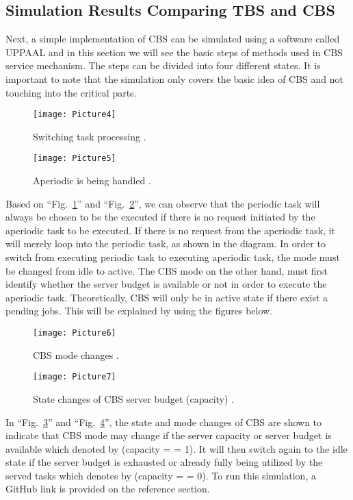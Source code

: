 \subsection{Simulation Results Comparing TBS and CBS}

Next, a simple implementation of CBS can be simulated using a software called UPPAAL and in this section we will see the basic steps of methods used in CBS service mechanism. The steps can be divided into four different states. It is important to note that the simulation only covers the basic idea of CBS and not touching into the critical parts. 

\begin{figure}[htp]
    \centering
    \texttt{[image: Picture4]}
    \caption{Switching task processing \cite{b10}.}
    \label{ikan1}
\end{figure}

\begin{figure}[htp]
    \centering
    \texttt{[image: Picture5]}
    \caption{Aperiodic is being handled \cite{b10}.}
    \label{ikan2}
\end{figure}

Based on ``Fig.~\ref{ikan1}'' and ``Fig.~\ref{ikan2}'', we can observe that the periodic task will always be chosen to be the executed if there is no request initiated by the aperiodic task to be executed. If there is no request from the aperiodic task, it will merely loop into the periodic task, as shown in the diagram. In order to switch from executing periodic task to executing aperiodic task, the mode must be changed from idle to active. The CBS mode on the other hand, must first identify whether the server budget is available or not in order to execute the aperiodic task. Theoretically, CBS will only be in active state if there exist a pending jobs. This will be explained by using the figures below.

\begin{figure}[htp]
    \centering
    \texttt{[image: Picture6]}
    \caption{CBS mode changes \cite{b10}.}
    \label{bulat1}
\end{figure}

\begin{figure}[htp]
    \centering
    \texttt{[image: Picture7]}
    \caption{State changes of CBS server budget (capacity) \cite{b10}.}
    \label{bulat2}
\end{figure}


In ``Fig.~\ref{bulat1}'' and ``Fig.~\ref{bulat2}'', the state and mode changes of CBS are shown to indicate that CBS mode may change if the server capacity or server budget is available which denoted by (capacity = = 1). It will then switch again to the idle state if the server budget is exhausted or already fully being utilized by the served tasks which denotes by (capacity = = 0). To run this simulation, a GitHub link is provided on the reference section.